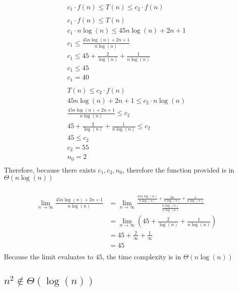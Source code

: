 \documentclass{article}
\begin{document}
            \begin{align*}
                c_1 \cdot f(n) \leq T(n) \leq c_2 \cdot f(n)\\
                \\
                c_1 \cdot f(n) \leq T(n)\\
                c_1 \cdot n\log(n) \leq 45n\log(n) + 2n + 1\\
                c_1 \leq \frac{45n\log(n) + 2n + 1}{n\log(n)}\\
                c_1 \leq 45 + \frac{2}{\log(n)} + \frac{1}{n\log(n)}\\
                c_1 \leq 45\\
                c_1 = 40\\
                \\
                T(n) \leq c_2 \cdot f(n)\\
                45n\log(n) + 2n + 1 \leq c_2 \cdot n\log(n)\\
                \frac{45n\log(n) + 2n + 1}{n\log(n)} \leq c_2\\
                45 + \frac{2}{\log(n)} + \frac{1}{n\log(n)} \leq c_2\\
                45 \leq c_2\\
                c_2 = 55\\
                n_0 = 2\\
            \end{align*}
            Therefore, because there exists $c_1, c_2, n_0$, therefore the function provided is in $\Theta (n\log(n))$
        \subsubsection{}
            \begin{align*}
                \lim_{n\to\infty} \frac{45n\log(n) + 2n + 1}{n\log(n)}
                &= \lim_{n\to\infty}\frac{\frac{45n\log(n)}{n\log(n)} + \frac{2n}{n\log(n)} + \frac{1}{n\log(n)}}{\frac{n\log(n)}{n\log(n)}}\\
                &= \lim_{n\to\infty}(45 + \frac{2}{\log(n)} + \frac{1}{n\log(n)})\\
                &= 45 + \frac{2}{\infty} + \frac{1}{\infty}\\
                &= 45\\
            \end{align*}
            Because the limit evaluates to $45$, the time complexity is in $\Theta(n\log(n))$
    \subsection{$n^2 \notin \Theta(\log(n))$}
\end{document}
